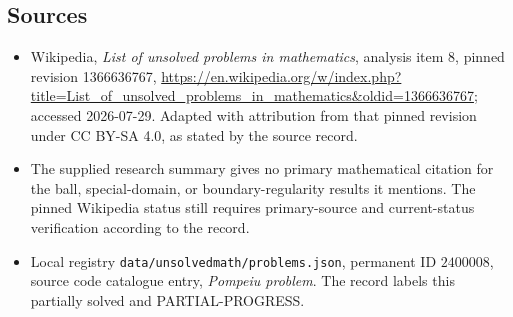 \documentclass[11pt]{article}
\begin{document}
\subsection{Sources}
\begin{itemize}
\item Wikipedia, \emph{List of unsolved problems in mathematics}, analysis item 8, pinned revision 1366636767, \url{https://en.wikipedia.org/w/index.php?title=List_of_unsolved_problems_in_mathematics&oldid=1366636767}; accessed 2026-07-29. Adapted with attribution from that pinned revision under CC BY-SA 4.0, as stated by the source record.
\item The supplied research summary gives no primary mathematical citation for the ball, special-domain, or boundary-regularity results it mentions. The pinned Wikipedia status still requires primary-source and current-status verification according to the record.
\item Local registry \texttt{data/unsolvedmath/problems.json}, permanent ID $2400008$, source code catalogue entry, \emph{Pompeiu problem}. The record labels this partially solved and PARTIAL-PROGRESS.
\end{itemize}
\end{document}
